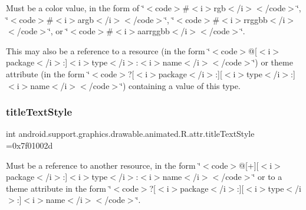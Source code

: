 Must be a color value, in the form of \char`\"{}$<$code$>$\#$<$i$>$rgb$<$/i$>$$<$/code$>$\char`\"{}, \char`\"{}$<$code$>$\#$<$i$>$argb$<$/i$>$$<$/code$>$\char`\"{}, \char`\"{}$<$code$>$\#$<$i$>$rrggbb$<$/i$>$$<$/code$>$\char`\"{}, or \char`\"{}$<$code$>$\#$<$i$>$aarrggbb$<$/i$>$$<$/code$>$\char`\"{}. 

This may also be a reference to a resource (in the form \char`\"{}$<$code$>$@\mbox{[}$<$i$>$package$<$/i$>$\+:\mbox{]}$<$i$>$type$<$/i$>$\+:$<$i$>$name$<$/i$>$$<$/code$>$\char`\"{}) or theme attribute (in the form \char`\"{}$<$code$>$?\mbox{[}$<$i$>$package$<$/i$>$\+:\mbox{]}\mbox{[}$<$i$>$type$<$/i$>$\+:\mbox{]}$<$i$>$name$<$/i$>$$<$/code$>$\char`\"{}) containing a value of this type. \mbox{\label{classandroid_1_1support_1_1graphics_1_1drawable_1_1animated_1_1R_1_1attr_a1e7e09dd1ab4acaa50be27767345b14b}} 
\subsubsection{\texorpdfstring{title\+Text\+Style}{titleTextStyle}}
{\footnotesize\ttfamily int android.\+support.\+graphics.\+drawable.\+animated.\+R.\+attr.\+title\+Text\+Style =0x7f01002d\hspace{0.3cm}{\ttfamily [static]}}

Must be a reference to another resource, in the form \char`\"{}$<$code$>$@\mbox{[}+\mbox{]}\mbox{[}$<$i$>$package$<$/i$>$\+:\mbox{]}$<$i$>$type$<$/i$>$\+:$<$i$>$name$<$/i$>$$<$/code$>$\char`\"{} or to a theme attribute in the form \char`\"{}$<$code$>$?\mbox{[}$<$i$>$package$<$/i$>$\+:\mbox{]}\mbox{[}$<$i$>$type$<$/i$>$\+:\mbox{]}$<$i$>$name$<$/i$>$$<$/code$>$\char`\"{}. \mbox{\label{classandroid_1_1support_1_1graphics_1_1drawable_1_1animated_1_1R_1_1attr_a7d8548465d87b6939943734cd62a54b5}} 
